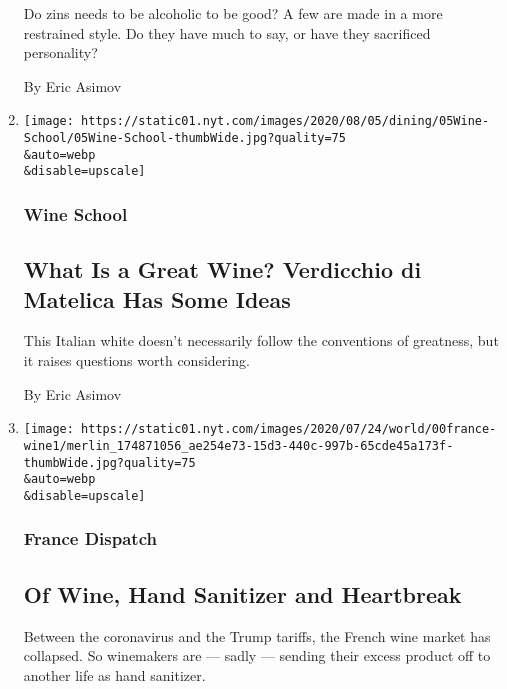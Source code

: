 \begin{enumerate}
  Do zins needs to be alcoholic to be good? A few are made in a more
  restrained style. Do they have much to say, or have they sacrificed
  personality?

  By Eric Asimov
\item
  \href{/2020/07/30/dining/drinks/wine-school-verdicchio-di-matelica.html}{}

  \texttt{[image: https://static01.nyt.com/images/2020/08/05/dining/05Wine-School/05Wine-School-thumbWide.jpg?quality=75\\\&auto=webp\\\&disable=upscale]}

  \hypertarget{wine-school-3}{%
  \subsubsection{Wine School}\label{wine-school-3}}

  \hypertarget{what-is-a-great-wine-verdicchio-di-matelica-has-some-ideas}{%
  \subsection{What Is a Great Wine? Verdicchio di Matelica Has Some
  Ideas}\label{what-is-a-great-wine-verdicchio-di-matelica-has-some-ideas}}

  This Italian white doesn't necessarily follow the conventions of
  greatness, but it raises questions worth considering.

  By Eric Asimov
\item
  \href{/2020/07/27/world/europe/france-alsace-wine-coronavirus.html}{}

  \texttt{[image: https://static01.nyt.com/images/2020/07/24/world/00france-wine1/merlin\_174871056\_ae254e73-15d3-440c-997b-65cde45a173f-thumbWide.jpg?quality=75\\\&auto=webp\\\&disable=upscale]}

  \hypertarget{france-dispatch}{%
  \subsubsection{France Dispatch}\label{france-dispatch}}

  \hypertarget{of-wine-hand-sanitizer-and-heartbreak}{%
  \subsection{Of Wine, Hand Sanitizer and
  Heartbreak}\label{of-wine-hand-sanitizer-and-heartbreak}}

  Between the coronavirus and the Trump tariffs, the French wine market
  has collapsed. So winemakers are --- sadly --- sending their excess
  product off to another life as hand sanitizer.


\end{enumerate}
